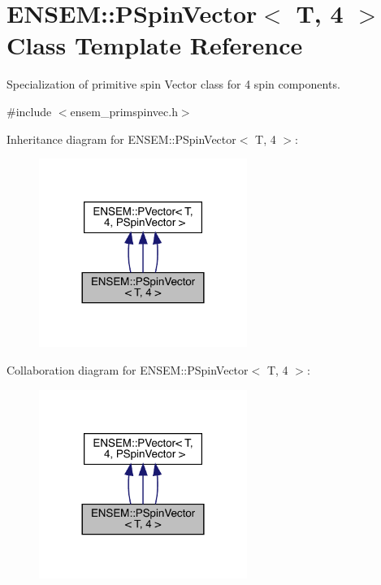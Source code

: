 \hypertarget{classENSEM_1_1PSpinVector_3_01T_00_014_01_4}{}\section{E\+N\+S\+EM\+:\+:P\+Spin\+Vector$<$ T, 4 $>$ Class Template Reference}
\label{classENSEM_1_1PSpinVector_3_01T_00_014_01_4}


Specialization of primitive spin Vector class for 4 spin components.  




{\ttfamily \#include $<$ensem\+\_\+primspinvec.\+h$>$}



Inheritance diagram for E\+N\+S\+EM\+:\+:P\+Spin\+Vector$<$ T, 4 $>$\+:
\nopagebreak
\begin{figure}[H]
\begin{center}
\leavevmode
\includegraphics[width=192pt]{d9/d03/classENSEM_1_1PSpinVector_3_01T_00_014_01_4__inherit__graph}
\end{center}
\end{figure}


Collaboration diagram for E\+N\+S\+EM\+:\+:P\+Spin\+Vector$<$ T, 4 $>$\+:
\nopagebreak
\begin{figure}[H]
\begin{center}
\leavevmode
\includegraphics[width=192pt]{d5/ddb/classENSEM_1_1PSpinVector_3_01T_00_014_01_4__coll__graph}
\end{center}
\end{figure}
